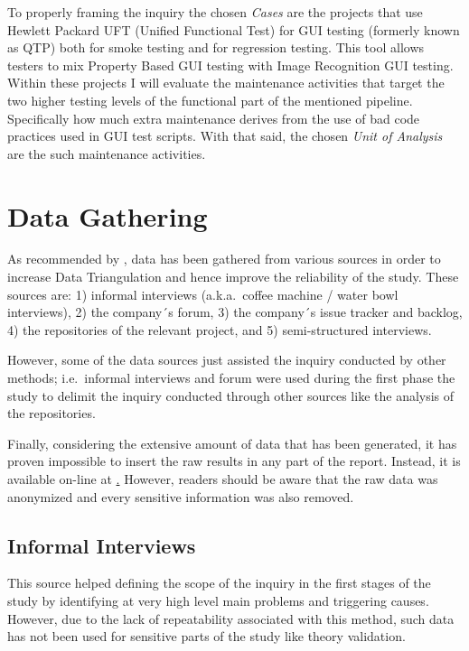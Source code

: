 To properly framing the inquiry the chosen \textit{Cases} are the projects that use Hewlett Packard UFT (Unified Functional Test) for GUI testing (formerly known as QTP) both for smoke testing and for regression testing. This tool allows testers to mix Property Based GUI testing with Image Recognition GUI testing. Within these projects I will evaluate the maintenance activities that target the two higher testing levels of the functional part of the mentioned pipeline. Specifically how much extra maintenance derives from the use of bad code practices used in GUI test scripts. With that said, the chosen \textit{Unit of Analysis} are the such maintenance activities. 
    

%
%
%
%

%
%
%
%
\section{Data Gathering}
As recommended by \cite{case_study_guide,case_study_software_engineering}, data has been gathered from various sources in order to increase Data Triangulation and hence improve the reliability of the study. These sources are: 1) informal interviews (a.k.a.\ coffee machine / water bowl interviews), 2) the company´s forum, 3) the company´s issue tracker and backlog, 4) the repositories of the relevant project, and 5) semi-structured interviews.

However, some of the data sources just assisted the inquiry conducted by other methods; i.e.\ informal interviews and forum were used during the first phase the study to delimit the inquiry conducted through other sources like the analysis of the repositories.

Finally, considering the extensive amount of data that has been generated, it has proven impossible to insert the raw results in any part of the report. Instead, it is available on-line at \href{http://???/}. However, readers should be aware that the raw data was anonymized and every sensitive information was also removed. 


\subsection{Informal Interviews}
This source helped defining the scope of the inquiry in the first stages of the study by identifying at very high level main problems and triggering causes. However, due to the lack of repeatability associated with this method, such data has not been used for sensitive parts of the study like theory validation.

